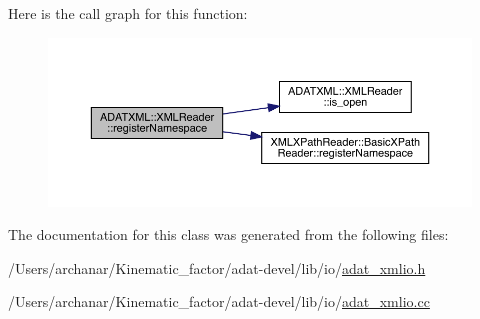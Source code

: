 Here is the call graph for this function\+:
\nopagebreak
\begin{figure}[H]
\begin{center}
\leavevmode
\includegraphics[width=350pt]{db/d3f/classADATXML_1_1XMLReader_aeb735523fc1858850ae8a2be61a34189_cgraph}
\end{center}
\end{figure}


The documentation for this class was generated from the following files\+:\begin{DoxyCompactItemize}
\item 
/\+Users/archanar/\+Kinematic\+\_\+factor/adat-\/devel/lib/io/\mbox{\hyperlink{adat-devel_2lib_2io_2adat__xmlio_8h}{adat\+\_\+xmlio.\+h}}\item 
/\+Users/archanar/\+Kinematic\+\_\+factor/adat-\/devel/lib/io/\mbox{\hyperlink{adat-devel_2lib_2io_2adat__xmlio_8cc}{adat\+\_\+xmlio.\+cc}}\end{DoxyCompactItemize}
